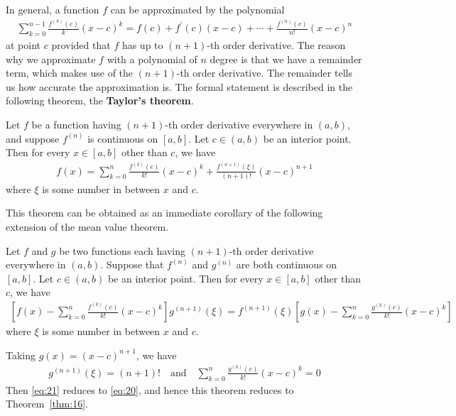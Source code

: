 \documentclass[thmcnt=section, 12pt]{my-elegantbook}
\begin{document}

In general, a function $f$ can be approximated by the polynomial
\begin{align*}
    \sum_{k=0}^{n-1} \frac{f^{(k)}(c)}{k}(x-c)^k
    = f(c) + f^\prime(c)(x-c) + \cdots + \frac{f^{(n)}(c)}{n!} (x-c)^{n}
\end{align*}
at point $c$ provided that $f$ has up to $(n+1)$-th order derivative. The reason why we approximate $f$ with a polynomial of $n$ degree is that we have a remainder term, which makes use of the $(n+1)$-th order derivative. The remainder tells us how accurate the approximation is. The formal statement is described in the following theorem, the \textbf{Taylor's theorem}.

\begin{theorem}[Taylor] \label{thm:16}
    Let $f$ be a function having $(n+1)$-th order derivative everywhere in $(a, b)$, and suppose $f^{(n)}$ is continuous on $[a, b]$. Let $c \in (a, b)$ be an interior point. Then for every $x \in [a, b]$ other than $c$, we have
    \begin{align}
        f(x) = \sum_{k=0}^{n} \frac{f^{(k)}(c)}{k!}(x-c)^k + \frac{f^{(n+1)}(\xi)}{(n+1)!} (x-c)^{n+1}
        \label{eq:20}
    \end{align}
    where $\xi$ is some number in between $x$ and $c$.
\end{theorem}

\par This theorem can be obtained as an immediate corollary of the following extension of the mean value theorem.

\begin{theorem} \label{thm:17}
    Let $f$ and $g$ be two functions each having $(n+1)$-th order derivative everywhere in $(a, b)$. Suppose that $f^{(n)}$ and $g^{(n)}$ are both continuous on $[a, b]$. Let $c \in (a, b)$ be an interior point. Then for every $x \in [a, b]$ other than $c$, we have
    \begin{align}
        \left[
            f(x) - \sum_{k=0}^{n} \frac{f^{(k)}(c)}{k!}(x-c)^k
            \right] g^{(n+1)}(\xi)
        = f^{(n+1)}(\xi) \left[
            g(x) - \sum_{k=0}^{n} \frac{g^{(k)}(c)}{k!}(x-c)^k
            \right]
        \label{eq:21}
    \end{align}
    where $\xi$ is some number in between $x$ and $c$.
\end{theorem}

\begin{remark}
    Taking $g(x) = (x-c)^{n+1}$, we have
    \begin{align*}
        g^{(n+1)}(\xi) = (n+1)!
        \quad \text{and} \quad
        \sum_{k=0}^{n} \frac{g^{(k)}(c)}{k!}(x-c)^k = 0
    \end{align*}
    Then \eqref{eq:21} reduces to \eqref{eq:20}, and hence this theorem reduces to Theorem~\ref{thm:16}.
\end{remark}
\end{document}
